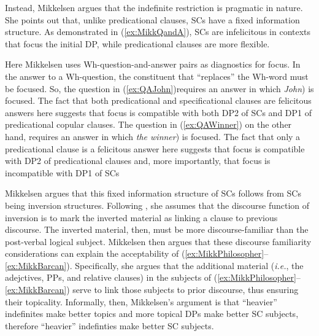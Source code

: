 \documentclass[
]{RCL}
\newcommand\quelle[1]{{%
  \unskip\nobreak\hfil\penalty50
  \hskip2em\hbox{}\nobreak\hfil#1%
  \parfillskip=0pt \finalhyphendemerits=0 \par}}
\begin{document}
Instead, Mikkelsen argues that the indefinite restriction is pragmatic in nature.
She points out \citep[following, among others,][]{halliday1967notes} that, unlike predicational clauses, SCs have a fixed information structure.
As demonstrated in (\ref{ex:MikkQandA}), SCs are infelicitous in contexts that focus the initial DP, while predicational clauses are more flexible.
\begin{exe}
\ex\label{ex:MikkQandA}
\end{exe}
Here Mikkelsen uses Wh-question-and-answer pairs as diagnostics for focus.
In the answer to a Wh-question, the constituent that ``replaces'' the Wh-word must be focused.
So, the question in (\ref{ex:QAJohn})requires an answer in which \textit{John}) is focused.
The fact that both predicational and specificational clauses are felicitous answers here suggests that focus is compatible with both DP2 of SCs and DP1 of predicational copular clauses.
The question in (\ref{ex:QAWinner}) on the other hand, requires an answer in which \textit{the winner}) is focused.
The fact that only a predicational clause is a felicitous answer here suggests that focus is compatible with DP2 of predicational clauses and, more importantly, that focus is incompatible with DP1 of SCs

Mikkelsen argues that this fixed information structure of SCs follows from SCs being inversion structures.
Following \citet{birner1994information,birner1996discourse}, she assumes that the discourse function of inversion is to mark the inverted material as linking a clause to previous discourse.
The inverted material, then, must be more discourse-familiar than the post-verbal logical subject.
Mikkelsen then argues that these discourse familiarity considerations can explain the acceptability of (\ref{ex:MikkPhilosopher}--\ref{ex:MikkBarcan}).
Specifically, she argues that the additional material (\textit{i.e.}, the adejctives, PPs, and relative clauses) in the subjects of (\ref{ex:MikkPhilosopher}--\ref{ex:MikkBarcan}) serve to link those subjects to prior discourse, thus ensuring their topicality.
Informally, then, Mikkelsen's argument is that ``heavier'' indefinites make better topics and more topical DPs make better SC subjects, therefore ``heavier'' indefinties make better SC subjects.
\end{document}
